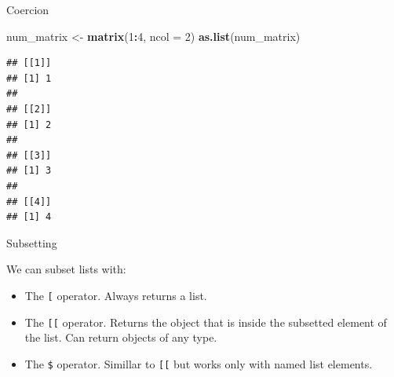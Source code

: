 \documentclass[ignorenonframetext,]{beamer}
\newenvironment{Shaded}{\begin{snugshade}}{\end{snugshade}}
\newcommand{\DataTypeTok}[1]{\textcolor[rgb]{0.13,0.29,0.53}{#1}}
\newcommand{\DecValTok}[1]{\textcolor[rgb]{0.00,0.00,0.81}{#1}}
\newcommand{\KeywordTok}[1]{\textcolor[rgb]{0.13,0.29,0.53}{\textbf{#1}}}
\newcommand{\NormalTok}[1]{#1}
\newcommand{\OperatorTok}[1]{\textcolor[rgb]{0.81,0.36,0.00}{\textbf{#1}}}
\newcommand{\StringTok}[1]{\textcolor[rgb]{0.31,0.60,0.02}{#1}}
\providecommand{\tightlist}{%
  \setlength{\itemsep}{0pt}\setlength{\parskip}{0pt}}
\begin{document}
\begin{frame}[fragile]{Coercion}
\protect\hypertarget{coercion-1}{}

\begin{Shaded}
\begin{Highlighting}[]
\NormalTok{num_matrix <-}\StringTok{ }\KeywordTok{matrix}\NormalTok{(}\DecValTok{1}\OperatorTok{:}\DecValTok{4}\NormalTok{, }\DataTypeTok{ncol =} \DecValTok{2}\NormalTok{)}
\KeywordTok{as.list}\NormalTok{(num_matrix)}
\end{Highlighting}
\end{Shaded}

\begin{verbatim}
## [[1]]
## [1] 1
## 
## [[2]]
## [1] 2
## 
## [[3]]
## [1] 3
## 
## [[4]]
## [1] 4
\end{verbatim}

\end{frame}

\begin{frame}[fragile]{Subsetting}
\protect\hypertarget{subsetting}{}

We can subset lists with:

\begin{itemize}
\tightlist
\item
  The \texttt{{[}} operator. Always returns a list.
\item
  The \texttt{{[}{[}} operator. Returns the object that is inside the
  subsetted element of the list. Can return objects of any type.
\item
  The \texttt{\$} operator. Simillar to \texttt{{[}{[}} but works only
  with named list elements.
\end{itemize}

\end{frame}
\end{document}
